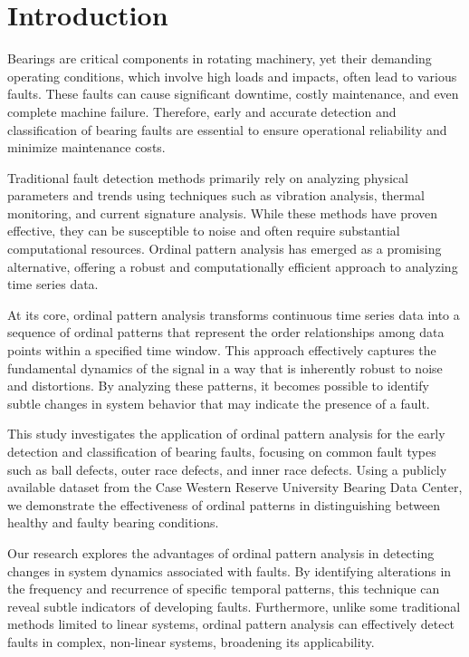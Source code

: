 \documentclass[sn-basic,pdflatex]{sn-jnl}
\theoremstyle{remark}
\theoremstyle{definition}
\begin{document}
\maketitle

\section{Introduction}\label{sec1}

Bearings are critical components in rotating machinery, yet their
demanding operating conditions, which involve high loads and impacts,
often lead to various faults. These faults can cause significant
downtime, costly maintenance, and even complete machine failure.
Therefore, early and accurate detection and classification of bearing
faults are essential to ensure operational reliability and minimize
maintenance costs.

Traditional fault detection methods primarily rely on analyzing physical
parameters and trends using techniques such as vibration analysis,
thermal monitoring, and current signature analysis. While these methods
have proven effective, they can be susceptible to noise and often
require substantial computational resources. Ordinal pattern analysis
has emerged as a promising alternative, offering a robust and
computationally efficient approach to analyzing time series data.

At its core, ordinal pattern analysis transforms continuous time series
data into a sequence of ordinal patterns that represent the order
relationships among data points within a specified time window. This
approach effectively captures the fundamental dynamics of the signal in
a way that is inherently robust to noise and distortions. By analyzing
these patterns, it becomes possible to identify subtle changes in system
behavior that may indicate the presence of a fault.

This study investigates the application of ordinal pattern analysis for
the early detection and classification of bearing faults, focusing on
common fault types such as ball defects, outer race defects, and inner
race defects. Using a publicly available dataset from the Case Western
Reserve University Bearing Data Center, we demonstrate the effectiveness
of ordinal patterns in distinguishing between healthy and faulty bearing
conditions.

Our research explores the advantages of ordinal pattern analysis in
detecting changes in system dynamics associated with faults. By
identifying alterations in the frequency and recurrence of specific
temporal patterns, this technique can reveal subtle indicators of
developing faults. Furthermore, unlike some traditional methods limited
to linear systems, ordinal pattern analysis can effectively detect
faults in complex, non-linear systems, broadening its applicability.
\end{document}
